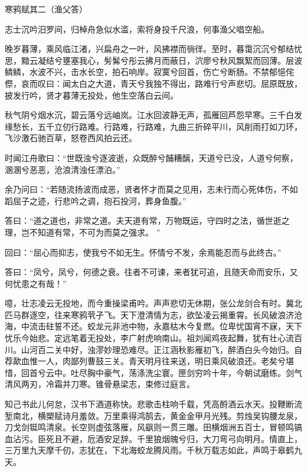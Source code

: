 {\kaishu
\begin{center}
\LARGE 寒鸦赋其二（渔父答）
\end{center}
\par
{\centering 志士沉吟汨罗间，归棹舟急似水滥，索将身投千尺浪，何事渔父唱空船。

}
\par
晚岁暮薄，乘风临江渚，兴扁舟之一叶，风拂襟而徜徉。至时，暮霭沉沉兮郁结忧思，黯云凝结兮壅塞我心，髣髴兮彤云拂月而蔽日，泬廖兮秋风飘絮而回薄。层波鳞鳞，水波不兴，击水长空，拍石响岸。寂寞兮回首，伤亡兮断肠。不禁郁悒侘傺，哀而叹曰：闻太白之大道，青天兮我独不得出，路难行兮声悲切。屈原既放，披发行吟，贤才暮薄无投处，他生空落白云间。
\par
秋气阴兮烟水沉，碧云落兮远岫岚。江水回波静无声，孤雁回芦怨早寒。三千白发缘愁长，五千立仞行路难。行路难，行路难，九曲三折碎平川，风削雨打如刀环，飞沙激石驰百草，怒卷西风拍云还。
\par
时闻江舟歌曰：“世既浊兮逐波逝，众既醉兮餔糟醨，天道兮已没，人道兮何察，溷溷兮恶恶，沧浪清浊任漂泊。”
\par
余乃问曰：“若随流扬波而成恶，贤者怀才而莫之见用，志未行而心死体伤，不如蹈屈子之迹，行悲吟之调，抱石投河，葬身鱼腹。”
\par
答曰：“道之道也，非常之道。夫天道有常，万物既运，守四时之法，循世逝之理，岂不知道有常，不可为而莫之强求。 ”
\par
回曰：“屈心而抑志，使我兮不如无生。怀情兮不发，余焉能忍而与此终古。”
\par
答曰：“凤兮，凤兮，何德之衰。往者不可谏，来者犹可追，且随天命而安乐，又何忧患之有哉！”
\par
噫，壮志凌云无投地，而今重操梁甫吟。声声悲切无休期，张公龙剑合有时。冀北匹马群逐空，往来寒鸦茕孑飞。天下澄清情为志，欲坠凌云揭重霄。长风破浪济沧海，中流击砫誓不还。蛟龙元非池中物，永嘉枯木今复燃。位卑忧国宵不寐，天下忧乐今始悲。定远笔着无投处，李广射虎响南山。祖刘闻鸡夜起舞，犹有壮心流百川。山河百二关中好，浊漻妙理恐难尽。正江涵秋影雁初飞，醉酒白头今始归。自荐歃血惟一人，肉鄙列曹鼓三关。青天明月往来送，明日乘风破浪还。老矣兮堪惜，回首兮云中。吐尽胸中豪气，荡涤洗尘寰。匣剑穷吟十年，今朝试磨练。剑气清风两刃，冷霜并刀寒。锥骨悬梁志，束修过庭言。
\par
知己书此儿何怠，汉书下酒道称快。悲歌击柱响千载，凭高酹酒云水天。投鞭断流堑南北，横槊赋诗月羞敛。万里乘得鸿鹄去，黄金金甲月光残。剪烛吴钩腰龙泉，刀戈剑铤鸣清泉。长空则虚弦落雁，风飖则一贯三雕。田横烟洲五百士，冒顿鸣镐血沾污。臣死且不避，卮酒安足辞。千里狼烟魄兮归，大刀弯弓向明月。情直上，三万里九天摩千仞，志犹在，下北海蛟龙腾风雨。千秋万载志如此，声鸣于皋鹤九天。

}
% 
